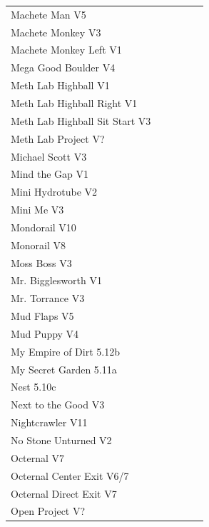 \begin{flushleft}
\begin{center}
\begin{supertabular}{p{0.76\linewidth}p{0.08\linewidth}}
Machete Man V5 & \pageref{vr:Machete Man} \\
Machete Monkey V3 & \pageref{rt:Machete Monkey} \\
Machete Monkey Left V1 & \pageref{vr:Machete Monkey Left} \\
Mega Good Boulder V4 & \pageref{rt:MGB} \\
Meth Lab Highball V1 & \pageref{rt:Meth Lab Highball} \\
Meth Lab Highball Right V1 & \pageref{rt:Meth Lab Highball Right} \\
Meth Lab Highball Sit Start V3 & \pageref{vr:Meth Lab Highball Sit Start} \\
Meth Lab Project V? & \pageref{rt:Meth Lab Project} \\
Michael Scott V3 & \pageref{rt:Michael Scott} \\
Mind the Gap V1 & \pageref{rt:Mind the Gap} \\
Mini Hydrotube V2 & \pageref{rt:Mini Hydrotube} \\
Mini Me V3 & \pageref{rt:Mini Me} \\
Mondorail V10 & \pageref{vr:Monorail Extension Project} \\
Monorail V8 & \pageref{rt:Monorail} \\
Moss Boss V3 & \pageref{rt:Moss Boss} \\
Mr. Bigglesworth V1 & \pageref{vr:Mr. Bigglesworth} \\
Mr. Torrance V3 & \pageref{rt:Mr. Torrance} \\
Mud Flaps V5 & \pageref{rt:Mud Flaps} \\
Mud Puppy V4 & \pageref{vr:Mud Puppy} \\
My Empire of Dirt 5.12b & \pageref{rt:My Empire of Dirt} \\
My Secret Garden 5.11a & \pageref{rt:My Secret Garden} \\
Nest 5.10c & \pageref{rt:Nest} \\
Next to the Good V3 & \pageref{rt:Next to the Good} \\
Nightcrawler V11 & \pageref{rt:Nightcrawler} \\
No Stone Unturned V2 & \pageref{rt:No Stone Unturned} \\
Octernal V7 & \pageref{rt:Octernal} \\
Octernal Center Exit V6/7 & \pageref{vr:Octernal Center Exit} \\
Octernal Direct Exit V7 & \pageref{vr:Octernal Direct Exit} \\
Open Project V? & \pageref{rt:cliffs_proj_2} \\

\end{supertabular}
\end{center}
\end{flushleft}
